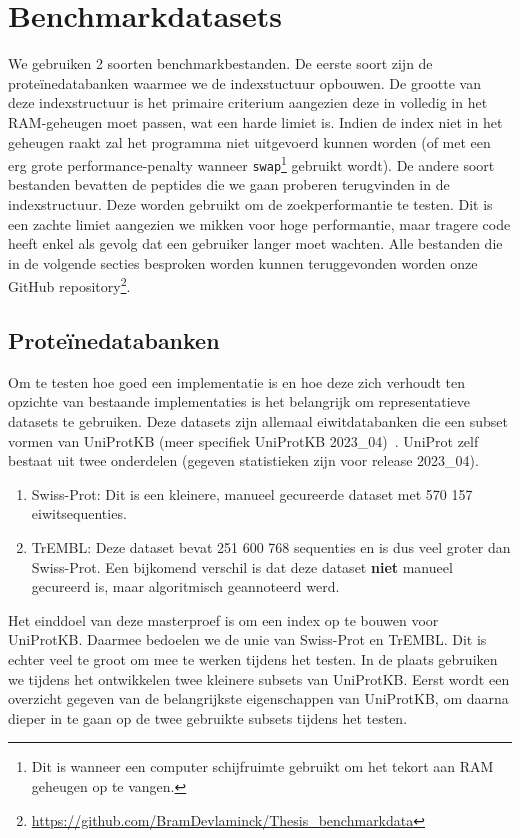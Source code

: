 \section{Benchmarkdatasets}\label{sec:datasets}
We gebruiken 2 soorten benchmarkbestanden.
De eerste soort zijn de proteïnedatabanken waarmee we de indexstuctuur opbouwen.
De grootte van deze indexstructuur is het primaire criterium aangezien deze in volledig in het RAM-geheugen moet passen, wat een harde limiet is.
Indien de index niet in het geheugen raakt zal het programma niet uitgevoerd kunnen worden (of met een erg grote performance-penalty wanneer \texttt{swap}\footnote{Dit is wanneer een computer schijfruimte gebruikt om het tekort aan RAM geheugen op te vangen.} gebruikt wordt).
De andere soort bestanden bevatten de peptides die we gaan proberen terugvinden in de indexstructuur.
Deze worden gebruikt om de zoekperformantie te testen.
Dit is een zachte limiet aangezien we mikken voor hoge performantie, maar tragere code heeft enkel als gevolg dat een gebruiker langer moet wachten.
Alle bestanden die in de volgende secties besproken worden kunnen teruggevonden worden onze GitHub repository\footnote{\url{https://github.com/BramDevlaminck/Thesis_benchmarkdata}}.

\subsection{Proteïnedatabanken}\label{subsec:proteine-databanken}
Om te testen hoe goed een implementatie is en hoe deze zich verhoudt ten opzichte van bestaande implementaties is het belangrijk om representatieve datasets te gebruiken.
Deze datasets zijn allemaal eiwitdatabanken die een subset vormen van UniProtKB (meer specifiek UniProtKB 2023\_04)~\cite{UniprotKB}.
UniProt zelf bestaat uit twee onderdelen (gegeven statistieken zijn voor release 2023\_04).
\begin{enumerate}
    \item Swiss-Prot: Dit is een kleinere, manueel gecureerde dataset met 570 157 eiwitsequenties.
    \item TrEMBL: Deze dataset bevat 251 600 768 sequenties en is dus veel groter dan Swiss-Prot.
    Een bijkomend verschil is dat deze dataset \textbf{niet} manueel gecureerd is, maar algoritmisch geannoteerd werd.
\end{enumerate}
Het einddoel van deze masterproef is om een index op te bouwen voor UniProtKB\@.
Daarmee bedoelen we de unie van Swiss-Prot en TrEMBL\@.
Dit is echter veel te groot om mee te werken tijdens het testen.
In de plaats gebruiken we tijdens het ontwikkelen twee kleinere subsets van UniProtKB\@.
Eerst wordt een overzicht gegeven van de belangrijkste eigenschappen van UniProtKB, om daarna dieper in te gaan op de twee gebruikte subsets tijdens het testen.

